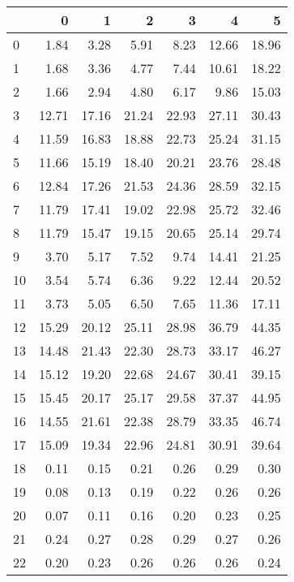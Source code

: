 \begin{tabular}{lrrrrrr}
\toprule
{} &       0 &       1 &       2 &       3 &       4 &        5 \\
\midrule
0  &    1.84 &    3.28 &    5.91 &    8.23 &   12.66 &    18.96 \\
1  &    1.68 &    3.36 &    4.77 &    7.44 &   10.61 &    18.22 \\
2  &    1.66 &    2.94 &    4.80 &    6.17 &    9.86 &    15.03 \\
3  &   12.71 &   17.16 &   21.24 &   22.93 &   27.11 &    30.43 \\
4  &   11.59 &   16.83 &   18.88 &   22.73 &   25.24 &    31.15 \\
5  &   11.66 &   15.19 &   18.40 &   20.21 &   23.76 &    28.48 \\
6  &   12.84 &   17.26 &   21.53 &   24.36 &   28.59 &    32.15 \\
7  &   11.79 &   17.41 &   19.02 &   22.98 &   25.72 &    32.46 \\
8  &   11.79 &   15.47 &   19.15 &   20.65 &   25.14 &    29.74 \\
9  &    3.70 &    5.17 &    7.52 &    9.74 &   14.41 &    21.25 \\
10 &    3.54 &    5.74 &    6.36 &    9.22 &   12.44 &    20.52 \\
11 &    3.73 &    5.05 &    6.50 &    7.65 &   11.36 &    17.11 \\
12 &   15.29 &   20.12 &   25.11 &   28.98 &   36.79 &    44.35 \\
13 &   14.48 &   21.43 &   22.30 &   28.73 &   33.17 &    46.27 \\
14 &   15.12 &   19.20 &   22.68 &   24.67 &   30.41 &    39.15 \\
15 &   15.45 &   20.17 &   25.17 &   29.58 &   37.37 &    44.95 \\
16 &   14.55 &   21.61 &   22.38 &   28.79 &   33.35 &    46.74 \\
17 &   15.09 &   19.34 &   22.96 &   24.81 &   30.91 &    39.64 \\
18 &    0.11 &    0.15 &    0.21 &    0.26 &    0.29 &     0.30 \\
19 &    0.08 &    0.13 &    0.19 &    0.22 &    0.26 &     0.26 \\
20 &    0.07 &    0.11 &    0.16 &    0.20 &    0.23 &     0.25 \\
21 &    0.24 &    0.27 &    0.28 &    0.29 &    0.27 &     0.26 \\
22 &    0.20 &    0.23 &    0.26 &    0.26 &    0.26 &     0.24 \\

\end{tabular}
